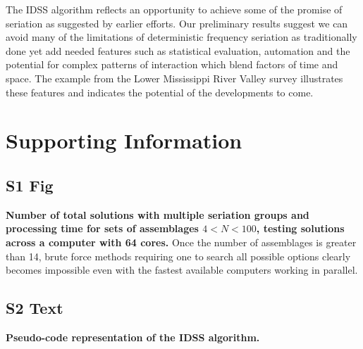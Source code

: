 \documentclass[10pt,letterpaper]{article}
\begin{document}
The IDSS algorithm reflects an opportunity to achieve some of the promise of seriation as suggested by earlier efforts. Our preliminary results suggest we can avoid many of the limitations of deterministic frequency seriation as traditionally done yet add needed features such as statistical evaluation, automation and the potential for complex patterns of interaction which blend factors of time and space. The example from the Lower Mississippi River Valley survey illustrates these features and indicates the potential of the developments to come. 

\clearpage
\section*{Supporting Information}


\subsection*{S1 Fig}
\label{S1_Fig}
{\bf Number of total solutions with multiple seriation groups and processing time for sets of assemblages $4 < N < 100$, testing solutions across a computer with 64 cores.}   Once the number of assemblages is greater than 14, brute force methods requiring one to search all possible options clearly becomes impossible even with the fastest available computers working in parallel. 


\subsection*{S2 Text}
\label{S2_Text}
{\bf Pseudo-code representation of the IDSS algorithm.}
\end{document}
